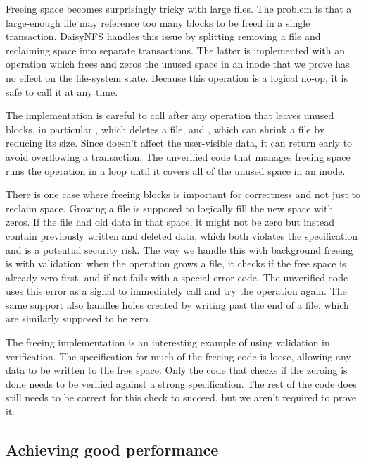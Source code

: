 Freeing space becomes surprisingly tricky with large files. The problem is that
a large-enough file may reference too many blocks to be
freed in a single transaction.
DaisyNFS handles this issue by splitting removing a file and reclaiming space
into separate transactions. The latter is implemented with an operation
 which frees and zeros the unused space in an inode that
we prove has no effect on the file-system state. Because this operation is a
logical no-op, it is safe to call it at any time.

The implementation is careful to call  after any operation
that leaves unused blocks, in particular , which deletes a file, and
, which can shrink a file by reducing its size. Since
 doesn't affect the user-visible data, it can return early to
avoid overflowing a transaction. The unverified code that manages freeing space
runs the operation in a loop until it covers all of the unused space in an
inode.

There is one case where freeing blocks is important for correctness and not just
to reclaim space. Growing a file is supposed to logically fill the new space
with zeros. If the file had old data in that space, it might not be zero but
instead contain previously written and deleted data, which both violates the specification and
is a potential security risk. The way we handle this with background freeing is
with validation: when the  operation grows a file, it checks if the
free space is already zero first, and if not fails with a special error code. The
unverified code uses this error as a signal to immediately call
 and try the operation again. The same support also handles
holes created by writing past the end of a file, which are similarly supposed to
be zero.

The freeing implementation is an interesting example of using validation in
verification. The specification for much of the freeing code is loose, allowing
any data to be written to the free space. Only the code that checks if the
zeroing is done needs to be verified against a strong specification. The rest of
the code does still needs to be correct for this check to succeed, but we
aren't required to prove it.

\subsection{Achieving good performance}

